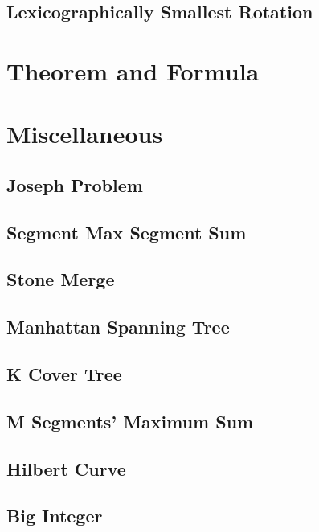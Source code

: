 \documentclass[a4paper,10pt,twocolumn,oneside]{article}
\begin{document}
\subsection{Lexicographically Smallest Rotation}


\section{Theorem and Formula}


\section{Miscellaneous}

\subsection{Joseph Problem}


\subsection{Segment Max Segment Sum}


\subsection{Stone Merge}


\subsection{Manhattan Spanning Tree}


\subsection{K Cover Tree}


\subsection{M Segments' Maximum Sum}


%

%

\subsection{Hilbert Curve}


\subsection{Big Integer}

\end{document}
